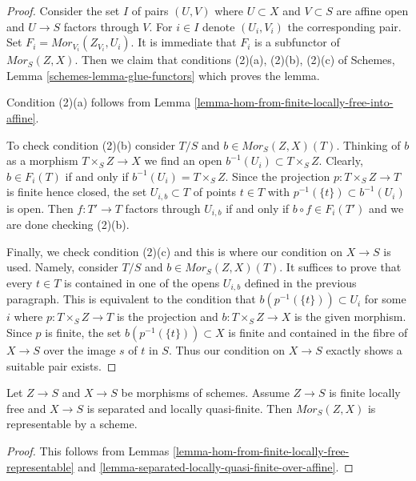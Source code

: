 \begin{proof}
Consider the set $I$ of pairs $(U, V)$ where $U \subset X$ and $V \subset S$
are affine open and $U \to S$ factors through $V$. For $i \in I$ denote
$(U_i, V_i)$ the corresponding pair. Set
$F_i = \mathit{Mor}_{V_i}(Z_{V_i}, U_i)$.
It is immediate that $F_i$ is a subfunctor of $\mathit{Mor}_S(Z, X)$.
Then we claim that conditions
(2)(a), (2)(b), (2)(c) of
Schemes, Lemma \ref{schemes-lemma-glue-functors} which proves the lemma.

\medskip\noindent
Condition (2)(a) follows from
Lemma \ref{lemma-hom-from-finite-locally-free-into-affine}.

\medskip\noindent
To check condition (2)(b) consider $T/S$ and $b \in \mathit{Mor}_S(Z, X)(T)$.
Thinking of $b$ as a morphism $T \times_S Z \to X$ we find an open
$b^{-1}(U_i) \subset T \times_S Z$. Clearly, $b \in F_i(T)$
if and only if $b^{-1}(U_i) = T \times_S Z$. Since the projection
$p : T \times_S Z \to T$ is finite hence closed, the set
$U_{i, b} \subset T$ of points $t \in T$ with
$p^{-1}(\{t\}) \subset b^{-1}(U_i)$ is open.
Then $f : T' \to T$ factors through $U_{i, b}$ if and only
if $b \circ f \in F_i(T')$ and we are done checking (2)(b).

\medskip\noindent
Finally, we check condition (2)(c) and this is where our condition
on $X \to S$ is used. Namely, consider
$T/S$ and $b \in \mathit{Mor}_S(Z, X)(T)$.
It suffices to prove that every $t \in T$
is contained in one of the opens $U_{i, b}$ defined
in the previous paragraph.
This is equivalent to the condition that
$b(p^{-1}(\{t\})) \subset U_i$ for some $i$
where $p : T \times_S Z \to T$ is the projection and
$b : T \times_S Z \to X$ is the given morphism.
Since $p$ is finite, the set $b(p^{-1}(\{t\})) \subset X$
is finite and contained in the fibre of $X \to S$ over
the image $s$ of $t$ in $S$.
Thus our condition on $X \to S$ exactly shows a
suitable pair exists.
\end{proof}

\begin{lemma}
\label{lemma-hom-from-finite-locally-free-separated-lqf}
Let $Z \to S$ and $X \to S$ be morphisms of schemes.
Assume $Z \to S$ is finite locally free and $X \to S$
is separated and locally quasi-finite.
Then $\mathit{Mor}_S(Z, X)$ is representable by a scheme.
\end{lemma}

\begin{proof}
This follows from
Lemmas \ref{lemma-hom-from-finite-locally-free-representable} and
\ref{lemma-separated-locally-quasi-finite-over-affine}.
\end{proof}









